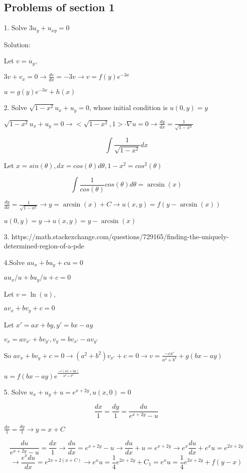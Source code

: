 \documentclass{article}
\begin{document}
\subsection{Problems of section 1}

1. Solve $3u_y+u_{xy} = 0$

Solution:

Let $v = u_y$, 

$3v + v_x = 0 \rightarrow \frac{dv}{dx} = -3v \rightarrow v = f(y) e^{-3x}$

$u = g(y)e^{-3x} + h(x)$

2. Solve $\sqrt{1-x^2} u_x + u_y =0$, whose initial condition is $u(0,y) = y$

$\sqrt{1-x^2} u_x + u_y =0 \rightarrow <\sqrt{1-x^2},1> \cdot \nabla u = 0 \rightarrow \frac{dy}{dx} = \frac{1}{\sqrt{1-x^2}}$

$$ \int \frac{1}{\sqrt{1-x^2}} dx$$

Let $x = sin(\theta), dx = cos(\theta) d\theta, 1-x^2 = cos^2(\theta)$

$$ \int \frac{1}{cos(\theta)} cos(\theta) d\theta = \arcsin(x)$$

$\frac{dy}{dx} = \frac{1}{\sqrt{1-x^2}} \rightarrow y = \arcsin(x) + C \rightarrow u(x,y) = f(y-\arcsin(x))$

$u(0,y) = y \rightarrow u(x,y) = y-\arcsin(x)$

3.
https://math.stackexchange.com/questions/729165/finding-the-uniquely-determined-region-of-a-pde

4.Solve $au_x+bu_y +c u =0$

$au_x/u+bu_y/u +c  =0$

Let $v = \ln(u),$

$av_x+bv_y +c  =0$

Let $x' = ax+by, y' = bx-ay$

$v_x = av_{x'}+bv_{y'}, v_y = bv_{x'} -av_{y'}$

So $av_x+bv_y +c  =0 \rightarrow (a^2+b^2)v_{x'} + c =0 \rightarrow v = \frac{-cx'}{a^2+b^2} + g(bx-ay)$

$u = f(bx-ay) e^{\frac{-c(ax+by)}{a^2+b^2}}$

5. Solve $u_x+u_y+u = e^{x+2y}, u(x,0)=0$

$$\frac{dx}{1} = \frac{dy}{1} = \frac{du}{e^{x+2y}-u}$$

$\frac{dx}{1} = \frac{dy}{1} \rightarrow y=x+C$

$$\frac{du}{e^{x+2y}-u} = \frac{dx}{1}\rightarrow  \frac{du}{dx} = e^{x+2y} -u \rightarrow \frac{du}{dx} + u =  e^{x+2y} \rightarrow e^{x}\frac{du}{dx} + e^{x}u = e^{2x+2y}$$
$$\rightarrow \frac{e^{x} du}{dx} =   e^{2x+2(x+C)} \rightarrow {e^{x} u} =   \frac{1}{4}e^{2x+2y}+ C_1 = {e^{x} u} =   \frac{1}{4}e^{2x+2y}+ f(y-x) $$
\end{document}
